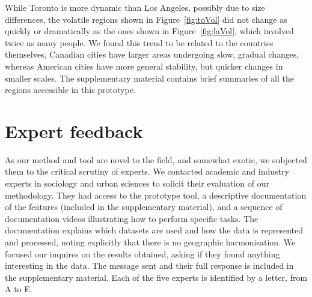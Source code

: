 


\smallskip While Toronto is more dynamic than Los Angeles, possibly due to size
differences, the volatile regions shown in Figure~\ref{fig:toVol} did not change
as quickly or dramatically as the ones shown in Figure~\ref{fig:laVol}, which
involved twice as many people. We found this trend to be related to the
countries themselves, Canadian cities have larger areas undergoing slow, gradual
changes, whereas American cities have more general stability, but quicker
changes in smaller scales. The supplementary material contains brief summaries
of all the regions accessible in this prototype.





\section{Expert feedback}
\label{sec:expert}
As our method and tool are novel to the field, and somewhat exotic,  we
subjected them to the critical scrutiny of experts. We contacted academic and
industry experts in sociology and urban sciences to solicit their evaluation of
our methodology. They had access to the prototype tool, a descriptive
documentation of the features (included in the supplementary material), and a
sequence of documentation videos illustrating how to perform specific tasks. The
documentation explains which datasets are used and how the data is represented
and processed, noting explicitly that there is no geographic harmonisation. We
focused our inquires on the results obtained, asking if they found anything
interesting in the data. The message sent and their full response is included in
the supplementary material. Each of the five experts is identified by a letter,
from A to E. 




